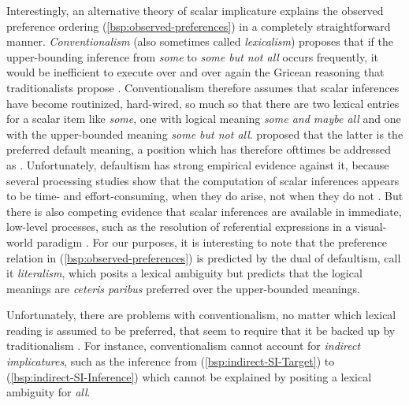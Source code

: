 \documentclass[fleqn,reqno,10pt,draft]{article}
\begin{document}
Interestingly, an alternative theory of scalar implicature explains
the observed preference ordering (\ref{bsp:observed-preferences}) in a
completely straightforward manner.  \emph{Conventionalism} (also
sometimes called \emph{lexicalism}) proposes that if the
upper-bounding inference from \emph{some} to \emph{some but not all}
occurs frequently, it would be inefficient to execute over and over
again the Gricean reasoning that traditionalists propose
\citep[e.g.][]{LevinsonPresumptiveMeanings2000,Chierchia:2004_ScalarImplicatures}. Conventionalism
therefore assumes that scalar inferences have become routinized,
hard-wired, so much so that there are two lexical entries for a scalar
item like \emph{some}, one with logical meaning \emph{some and maybe
  all} and one with the upper-bounded meaning \emph{some but not
  all}. \citet{LevinsonPresumptiveMeanings2000} proposed that the
latter is the preferred default meaning, a position which has
therefore ofttimes be addressed as . Unfortunately,
defaultism has strong empirical evidence against it, because several
processing studies show that the computation of scalar inferences
appears to be time- and effort-consuming, when they do arise,
not when they do not
\citep[c.f.][]{BrehenyKatsos2006:Are-Generalised,BrehenyKatsos2008:Experimental-In,NeysDe-NeysSchaeken2007:When-People-Are}. But
there is also competing evidence that scalar inferences are available
in immediate, low-level processes, such as the resolution of
referential expressions in a visual-world paradigm
\citep{GrodnerKlein2010:Some-and-Possib}. For our purposes, it is
interesting to note that the preference relation in
(\ref{bsp:observed-preferences}) is predicted by the dual of
defaultism, call it \emph{literalism}, which posits a lexical
ambiguity but predicts that the logical meanings are \emph{ceteris
  paribus} preferred over the upper-bounded meanings.

Unfortunately, there are problems with conventionalism, no matter
which lexical reading is assumed to be preferred, that seem to require
that it be backed up by traditionalism
\citep[e.g.][]{Sauerland2012:The-Computation}.
For instance, conventionalism cannot account for \emph{indirect
  implicatures}, such as the inference from
(\ref{bsp:indirect-SI-Target}) to (\ref{bsp:indirect-SI-Inference})
which cannot be explained by positing a lexical ambiguity for
\emph{all}.
\end{document}
